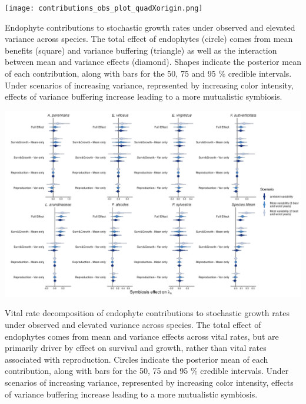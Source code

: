 \documentclass[lineno, sn-basic]{sn-jnl}%
\begin{document}
\begin{myfigure}[H]
	\centering
	\texttt{[image: contributions\_obs\_plot\_quadXorigin.png]}
	\caption[Endophyte contributions to stochastic growth rates under observed and elevated variance across species]{Endophyte contributions to stochastic growth rates under observed and elevated variance across species. The total effect of endophytes (circle) comes from mean benefits (square) and variance buffering (triangle) as well as the interaction between mean and variance effects (diamond). Shapes indicate the posterior mean of each contribution, along with bars for the 50, 75 and 95 \% credible intervals.  Under scenarios of increasing variance, represented by increasing color intensity, effects of variance buffering increase leading to a more mutualistic symbiosis.}
\end{myfigure}


\begin{myfigure}[H]
	\centering
	\includegraphics[width=\linewidth]{VRdecomp_contributions_obs_plot.png}
	\caption[Vital rate decomposition of endophyte contributions to stochastic growth rates under observed and elevated variance across species]{Vital rate decomposition of endophyte contributions to stochastic growth rates under observed and elevated variance across species. The total effect of endophytes comes from mean and variance effects across vital rates, but are primarily driver by effect on survival and growth, rather than vital rates associated with reproduction. Circles indicate the posterior mean of each contribution, along with bars for the 50, 75 and 95 \% credible intervals.  Under scenarios of increasing variance, represented by increasing color intensity, effects of variance buffering increase leading to a more mutualistic symbiosis.}
\end{myfigure}
\end{document}

